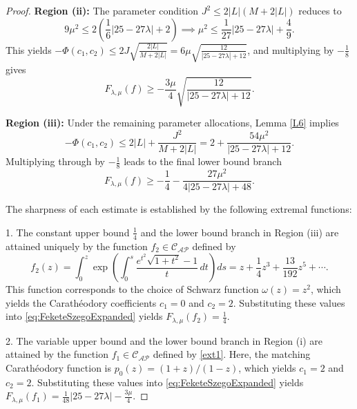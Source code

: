 \documentclass[11pt]{article}
\numberwithin{equation}{section}
\begin{document}
\begin{proof}
\medskip
\noindent\textbf{Region (ii):} The parameter condition $J^2 \le 2|L|(M+2|L|)$ reduces to
\[
9\mu^2 \le 2\left(\frac{1}{6}|25-27\lambda| + 2\right) \implies \mu^2 \le \frac{1}{27} |25 - 27\lambda| + \frac{4}{9}.
\]
This yields $-\Phi(c_1,c_2) \le 2J \sqrt{\frac{2|L|}{M+2|L|}} = 6\mu \sqrt{\frac{12}{|25-27\lambda|+12}}$, and multiplying by $-\frac{1}{8}$ gives
\[
F_{\lambda,\mu}(f) \ge -\frac{3\mu}{4} \sqrt{ \frac{12}{|25 - 27\lambda| + 12} }.
\]

\medskip
\noindent\textbf{Region (iii):} Under the remaining parameter allocations, Lemma \ref{L6} implies
\[
-\Phi(c_1,c_2) \le 2|L| + \frac{J^2}{M+2|L|} = 2 + \frac{54\mu^2}{|25-27\lambda|+12}.
\]
Multiplying through by $-\frac{1}{8}$ leads to the final lower bound branch
\[
F_{\lambda,\mu}(f) \ge -\frac{1}{4} - \frac{27\mu^2}{4 |25 - 27\lambda| + 48}.
\]

The sharpness of each estimate is established by the following extremal functions:

1. The constant upper bound $\frac{1}{4}$ and the lower bound branch in Region (iii) are attained uniquely by the function $f_2 \in \mathcal{C}_{\mathcal{AP}}$ defined by
\begin{equation}\label{ext2_dup}
f_2(z) = \int_0^z \exp\left( \int_0^s \frac{e^{t^2}\sqrt{1+t^2}-1}{t}\,dt \right) ds = z + \frac{1}{4}z^3 + \frac{13}{192}z^5 + \cdots.
\end{equation}
This function corresponds to the choice of Schwarz function $\omega(z) = z^2$, which yields the Carath\'{e}odory coefficients $c_1=0$ and $c_2=2$. Substituting these values into \eqref{eq:FeketeSzegoExpanded} yields $F_{\lambda,\mu}(f_2) = \frac{1}{4}$.

2. The variable upper bound and the lower bound branch in Region (i) are attained by the function $f_1 \in \mathcal{C}_{\mathcal{AP}}$ defined by \eqref{ext1}. Here, the matching Carath\'{e}odory function is $p_0(z) = (1+z)/(1-z)$, which yields $c_1=2$ and $c_2=2$. Substituting these values into \eqref{eq:FeketeSzegoExpanded} yields $F_{\lambda,\mu}(f_1) = \frac{1}{48}|25-27\lambda| - \frac{3\mu}{4}$.


\end{proof}
\end{document}
